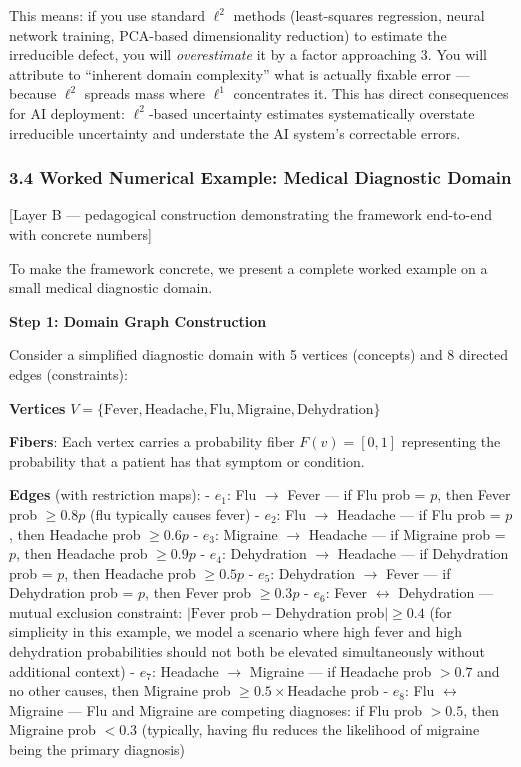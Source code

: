 \documentclass[
]{article}
\begin{document}
This means: if you use standard \(\ell^2\) methods (least-squares
regression, neural network training, PCA-based dimensionality reduction)
to estimate the irreducible defect, you will \emph{overestimate} it by a
factor approaching 3. You will attribute to ``inherent domain
complexity'' what is actually fixable error --- because \(\ell^2\)
spreads mass where \(\ell^1\) concentrates it. This has direct
consequences for AI deployment: \(\ell^2\)-based uncertainty estimates
systematically overstate irreducible uncertainty and understate the AI
system's correctable errors.

\subsubsection{3.4 Worked Numerical Example: Medical Diagnostic
Domain}\label{worked-numerical-example-medical-diagnostic-domain}

{[}Layer B --- pedagogical construction demonstrating the framework
end-to-end with concrete numbers{]}

To make the framework concrete, we present a complete worked example on
a small medical diagnostic domain.

\textbf{Step 1: Domain Graph Construction}

Consider a simplified diagnostic domain with 5 vertices (concepts) and 8
directed edges (constraints):

\textbf{Vertices}
\(V = \{\text{Fever}, \text{Headache}, \text{Flu}, \text{Migraine}, \text{Dehydration}\}\)

\textbf{Fibers}: Each vertex carries a probability fiber
\(F(v) = [0, 1]\) representing the probability that a patient has that
symptom or condition.

\textbf{Edges} (with restriction maps): - \(e_1\): Flu \(\to\) Fever ---
if Flu prob = \(p\), then Fever prob \(\geq 0.8p\) (flu typically causes
fever) - \(e_2\): Flu \(\to\) Headache --- if Flu prob = \(p\), then
Headache prob \(\geq 0.6p\) - \(e_3\): Migraine \(\to\) Headache --- if
Migraine prob = \(p\), then Headache prob \(\geq 0.9p\) - \(e_4\):
Dehydration \(\to\) Headache --- if Dehydration prob = \(p\), then
Headache prob \(\geq 0.5p\) - \(e_5\): Dehydration \(\to\) Fever --- if
Dehydration prob = \(p\), then Fever prob \(\geq 0.3p\) - \(e_6\): Fever
\(\leftrightarrow\) Dehydration --- mutual exclusion constraint:
\(|\text{Fever prob} - \text{Dehydration prob}| \geq 0.4\) (for
simplicity in this example, we model a scenario where high fever and
high dehydration probabilities should not both be elevated
simultaneously without additional context) - \(e_7\): Headache \(\to\)
Migraine --- if Headache prob \(> 0.7\) and no other causes, then
Migraine prob \(\geq 0.5 \times \text{Headache prob}\) - \(e_8\): Flu
\(\leftrightarrow\) Migraine --- Flu and Migraine are competing
diagnoses: if Flu prob \(> 0.5\), then Migraine prob \(< 0.3\)
(typically, having flu reduces the likelihood of migraine being the
primary diagnosis)
\end{document}
